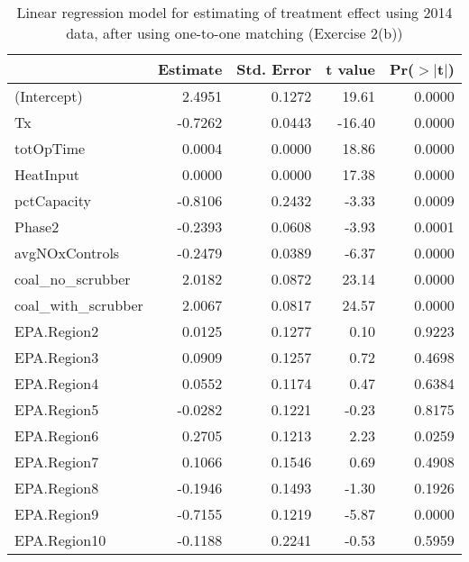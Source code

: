 \begin{table}[ht]
\centering
\begin{tabular}{lrrrr}
  \toprule
 & Estimate & Std. Error & t value & Pr($>$$|$t$|$) \\ 
  \midrule
(Intercept) & 2.4951 & 0.1272 & 19.61 & 0.0000 \\ 
  Tx & -0.7262 & 0.0443 & -16.40 & 0.0000 \\ 
  totOpTime & 0.0004 & 0.0000 & 18.86 & 0.0000 \\ 
  HeatInput & 0.0000 & 0.0000 & 17.38 & 0.0000 \\ 
  pctCapacity & -0.8106 & 0.2432 & -3.33 & 0.0009 \\ 
  Phase2 & -0.2393 & 0.0608 & -3.93 & 0.0001 \\ 
  avgNOxControls & -0.2479 & 0.0389 & -6.37 & 0.0000 \\ 
  coal\_no\_scrubber & 2.0182 & 0.0872 & 23.14 & 0.0000 \\ 
  coal\_with\_scrubber & 2.0067 & 0.0817 & 24.57 & 0.0000 \\ 
  EPA.Region2 & 0.0125 & 0.1277 & 0.10 & 0.9223 \\ 
  EPA.Region3 & 0.0909 & 0.1257 & 0.72 & 0.4698 \\ 
  EPA.Region4 & 0.0552 & 0.1174 & 0.47 & 0.6384 \\ 
  EPA.Region5 & -0.0282 & 0.1221 & -0.23 & 0.8175 \\ 
  EPA.Region6 & 0.2705 & 0.1213 & 2.23 & 0.0259 \\ 
  EPA.Region7 & 0.1066 & 0.1546 & 0.69 & 0.4908 \\ 
  EPA.Region8 & -0.1946 & 0.1493 & -1.30 & 0.1926 \\ 
  EPA.Region9 & -0.7155 & 0.1219 & -5.87 & 0.0000 \\ 
  EPA.Region10 & -0.1188 & 0.2241 & -0.53 & 0.5959 \\ 
   \bottomrule
\end{tabular}
\caption{Linear regression model for estimating of treatment effect using 2014 data, after using one-to-one matching (Exercise 2(b))} 
\label{tab:lm-2b-14}
\end{table}


